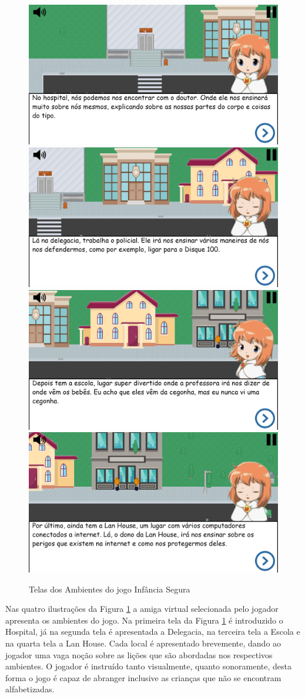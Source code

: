 \documentclass[12pt]{article}
\begin{document}
\vspace{-0.2cm}
\begin{figure}[ht]
\centering
\includegraphics[width=.485\textwidth]{Figuras/Jogo/Hospital.png}
\includegraphics[width=.485\textwidth]{Figuras/Jogo/Delegacia.png}
\includegraphics[width=.485\textwidth]{Figuras/Jogo/Escola.png}
\includegraphics[width=.485\textwidth]{Figuras/Jogo/Lan-House.png}
\vspace{-0.2cm}
\caption{Telas dos Ambientes do jogo Infância Segura}
\label{fig:ambientes}
\end{figure}
\vspace{-0.2cm}

Nas quatro ilustrações da Figura \ref{fig:ambientes} a amiga virtual selecionada pelo jogador apresenta os ambientes do jogo. Na primeira tela da Figura \ref{fig:ambientes} é introduzido o Hospital, já na segunda tela é apresentada a Delegacia, na terceira tela a Escola e na quarta tela a Lan House. Cada local é apresentado brevemente, dando ao jogador uma vaga noção sobre as lições que são abordadas nos respectivos ambientes. O jogador é instruído tanto visualmente, quanto sonoramente, desta forma o jogo é capaz de abranger inclusive as crianças que não se encontram alfabetizadas. 
\end{document}
